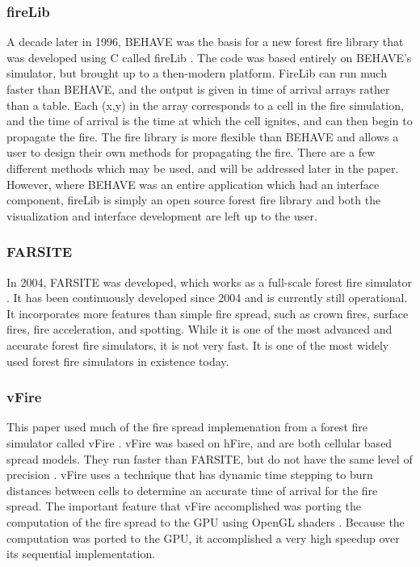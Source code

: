 \subsubsection{fireLib}
A decade later in 1996, BEHAVE was the basis for a new forest fire library that was developed using C called fireLib \cite{fireLib}. The code was based entirely on BEHAVE's simulator, but brought up to a then-modern platform. FireLib can run much faster than BEHAVE, and the output is given in time of arrival arrays rather than a table. Each (x,y) in the array corresponds to a cell in the fire simulation, and the time of arrival is the time at which the cell ignites, and can then begin to propagate the fire. The fire library is more flexible than BEHAVE and allows a user to design their own methods for propagating the fire. There are a few different methods which may be used, and will be addressed later in the paper. However, where BEHAVE was an entire application which had an interface component, fireLib is simply an open source forest fire library and both the visualization and interface development are left up to the user.

\subsubsection{FARSITE}
In 2004, FARSITE was developed, which works as a full-scale forest fire simulator \cite{FARSITE}. It has been continuously developed since 2004 and is currently still operational. It incorporates more features than simple fire spread, such as crown fires, surface fires, fire acceleration, and spotting. While it is one of the most advanced and accurate forest fire simulators, it is not very fast. It is one of the most widely used forest fire simulators in existence today.

\subsubsection{vFire}
This paper used much of the fire spread implemenation from a forest fire simulator called vFire \cite{vFire}. vFire was based on hFire, and are both cellular based spread models. They run faster than FARSITE, but do not have the same level of precision \cite{hFire}. vFire uses a technique that has dynamic time stepping to burn distances between cells to determine an accurate time of arrival for the fire spread. The important feature that vFire accomplished was porting the computation of the fire spread to the GPU using OpenGL shaders \cite{opengl}. Because the computation was ported to the GPU, it accomplished a very high speedup over its sequential implementation. 

